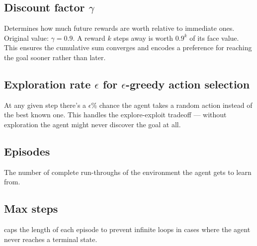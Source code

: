 \documentclass[12pt, a4paper]{article}
\begin{document}
\subsection{Discount factor $\gamma$}
Determines how much future rewards are worth relative to immediate ones.\newline
Original value: $\gamma = 0.9$. A reward $k$ steps away is worth $0.9^k$ of its face value. This ensures the cumulative sum converges and encodes a preference for reaching the goal sooner rather than later.

\subsection{Exploration rate $\epsilon$ for $\epsilon$-greedy action selection}
At any given step there's a $\epsilon$\% chance the agent takes a random action instead of the best known one.\newline
This handles the explore-exploit tradeoff — without exploration the agent might never discover the goal at all.

\subsection{Episodes}
The number of complete run-throughs of the environment the agent gets to learn from.

\subsection{Max steps}
caps the length of each episode to prevent infinite loops in cases where the agent never reaches a terminal state.
\end{document}
